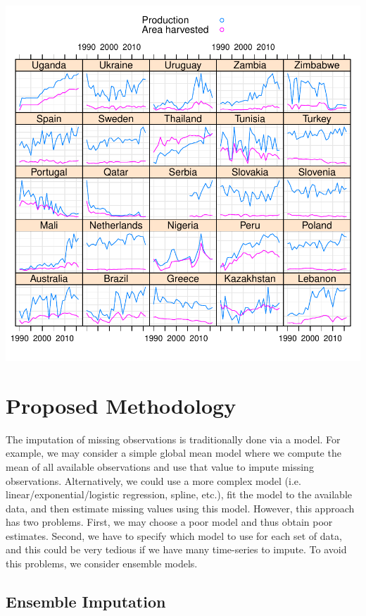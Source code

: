 \documentclass[nojss]{jss}
\begin{document}
\includegraphics{methodologyImputation-wheat-production-area-explore}


\newpage



\section{Proposed Methodology}

The imputation of missing observations is traditionally done via a model.  For example, we may consider a simple global mean model where we compute the mean of all available observations and use that value to impute missing observations.  Alternatively, we could use a more complex model (i.e. linear/exponential/logistic regression, spline, etc.), fit the model to the available data, and then estimate missing values using this model.  However, this approach has two problems.  First, we may choose a poor model and thus obtain poor estimates.  Second, we have to specify which model to use for each set of data, and this could be very tedious if we have many time-series to impute.  To avoid this problems, we consider ensemble models.

\subsection{Ensemble Imputation}
\end{document}
